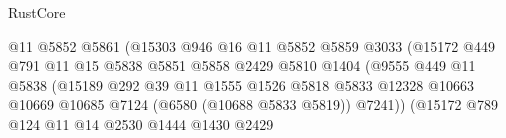 \begin{lexlean}{RustCore}
\begin{coremodule}
                                          @11
                                          @5852
                                          @5861
                                          (@15303
                                            @946
                                            @16
                                            @11
                                            @5852
                                            @5859
                                            @3033
                                            (@15172
                                              @449
                                              @791
                                              @11
                                              @15
                                              @5838
                                              @5851
                                              @5858
                                              @2429
                                              @5810
                                              @1404
                                              (@9555
                                                @449
                                                @11
                                                @5838
                                                (@15189
                                                  @292
                                                  @39
                                                  @11
                                                  @1555
                                                  @1526
                                                  @5818
                                                  @5833
                                                  @12328
                                                  @10663
                                                  @10669
                                                  @10685
                                                  @7124
                                                  (@6580 (@10688 @5833 @5819))
                                                  @7241))
                                              (@15172
                                                @789
                                                @124
                                                @11
                                                @14
                                                @2530
                                                @1444
                                                @1430
                                                @2429

\end{coremodule}
\end{lexlean}
